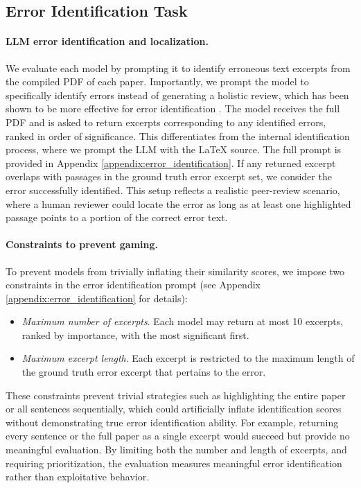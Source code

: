 \documentclass{article}
\begin{document}
\subsection{Error Identification Task}
\label{subsec:error_id}

\paragraph{LLM error identification and localization.} We evaluate each model by prompting it to identify erroneous text excerpts from the compiled PDF of each paper. Importantly, we prompt the model to specifically identify errors instead of generating a holistic review, which has been shown to be more effective for error identification \citep{liu2023}. The model receives the full PDF and is asked to return excerpts corresponding to any identified errors, ranked in order of significance. This differentiates from the internal identification process, where we prompt the LLM with the LaTeX source. The full prompt is provided in Appendix \ref{appendix:error_identification}. If any returned excerpt overlaps with passages in the ground truth error excerpt set, we consider the error successfully identified. This setup reflects a realistic peer-review scenario, where a human reviewer could locate the error as long as at least one highlighted passage points to a portion of the correct error text.

\paragraph{Constraints to prevent gaming.} To prevent models from trivially inflating their similarity scores, we impose two constraints in the error identification prompt (see Appendix \ref{appendix:error_identification} for details): 

\begin{itemize}
    \item \textit{Maximum number of excerpts}. Each model may return at most 10 excerpts, ranked by importance, with the most significant first.
    \item \textit{Maximum excerpt length}. Each excerpt is restricted to the maximum length of the ground truth error excerpt that pertains to the error.
\end{itemize}

These constraints prevent trivial strategies such as highlighting the entire paper or all sentences sequentially, which could artificially inflate identification scores without demonstrating true error identification ability. For example, returning every sentence or the full paper as a single excerpt would succeed but provide no meaningful evaluation. By limiting both the number and length of excerpts, and requiring prioritization, the evaluation measures meaningful error identification rather than exploitative behavior.
\end{document}
